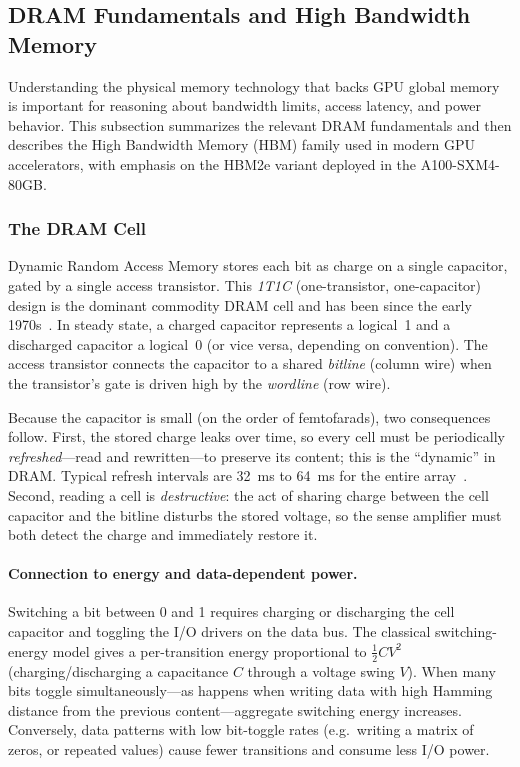 \subsection{DRAM Fundamentals and High Bandwidth Memory}\label{sec:dram-hbm}

Understanding the physical memory technology that backs GPU global memory is
important for reasoning about bandwidth limits, access latency, and power
behavior. This subsection summarizes the relevant DRAM fundamentals and then
describes the High Bandwidth Memory (HBM) family used in modern GPU
accelerators, with emphasis on the HBM2e variant deployed in the
A100-SXM4-80GB.

\subsubsection{The DRAM Cell}\label{sec:dram-cell}

Dynamic Random Access Memory stores each bit as charge on a single capacitor,
gated by a single access transistor. This \emph{1T1C} (one-transistor,
one-capacitor) design is the dominant commodity DRAM cell and has been since
the early 1970s~\cite{li2018highspeed-dram}. In steady state, a charged
capacitor represents a logical~1 and a discharged capacitor a logical~0 (or
vice versa, depending on convention). The access transistor connects the
capacitor to a shared \emph{bitline} (column wire) when the transistor's gate
is driven high by the \emph{wordline} (row wire).

Because the capacitor is small (on the order of femtofarads), two consequences
follow. First, the stored charge leaks over time, so every cell must be
periodically \emph{refreshed}---read and rewritten---to preserve its content;
this is the ``dynamic'' in DRAM. Typical refresh intervals are
\SI{32}{\milli\second} to \SI{64}{\milli\second} for the entire
array~\cite{li2018highspeed-dram}. Second, reading a cell is
\emph{destructive}: the act of sharing charge between the cell capacitor and
the bitline disturbs the stored voltage, so the sense amplifier must both
detect the charge and immediately restore it.

\paragraph{Connection to energy and data-dependent power.}
Switching a bit between 0 and 1 requires charging or discharging the cell
capacitor and toggling the I/O drivers on the data bus. The classical
switching-energy model gives a per-transition energy proportional to
$\tfrac{1}{2}CV^2$ (charging/discharging a capacitance $C$ through a voltage
swing $V$). When many bits toggle simultaneously---as happens when writing
data with high Hamming distance from the previous content---aggregate
switching energy increases. Conversely, data patterns with low bit-toggle
rates (e.g.\ writing a matrix of zeros, or repeated values) cause fewer
transitions and consume less I/O power.

